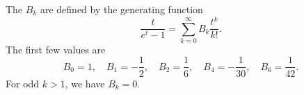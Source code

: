 The  $B_k$ are defined by the generating function
$$
\frac{t}{e^t - 1} = \sum_{k=0}^{\infty} B_k \frac{t^k}{k!}.
$$
The first few values are
$$
B_0 = 1,\quad B_1 = -\frac{1}{2},\quad B_2 = \frac{1}{6},\quad B_4 = -\frac{1}{30},\quad B_6 = \frac{1}{42}.
$$
For odd $k > 1$, we have $B_k = 0$.
